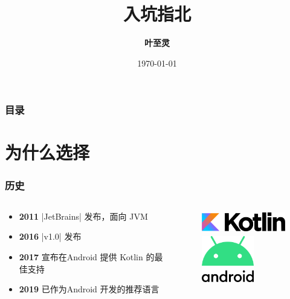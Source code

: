 \documentclass[aspectratio=169]{ctexbeamer}
\title{\ttfamily{Kotlin} 入坑指北}
\date{\today}
\author{\bfseries 叶至灵}
\begin{document}
\maketitle

\begin{frame}[c]
    \frametitle{目录}
    \bfseries
    \tableofcontents[hideallsubsections]
    \thispagestyle{empty}
\end{frame}

\section{为什么选择 }%
\begin{frame}[fragile]
    \frametitle{历史}
    \begin{columns}
        \begin{column}{0.5\textwidth}
            \begin{itemize}
                \item \textbf{2011} |JetBrains| 发布，面向 JVM
                \item \textbf{2016} |v1.0| 发布
                \item \textbf{2017} \google{} 宣布在{\color{android}\faAndroid}Android 提供 Kotlin 的最佳支持
                \item \textbf{2019} 已作为{\color{android}\faAndroid}Android 开发的推荐语言
            \end{itemize}
        \end{column}
        \begin{column}{0.5\textwidth}
            \begin{figure}
            \begin{center}
                \includegraphics[height=1cm]{fig/Kotlin}\\
                \vspace{12pt}
                \includegraphics[height=2cm]{fig/android}
            \end{center}
            \end{figure}
        \end{column}
    \end{columns}
\end{frame}
\end{document}

